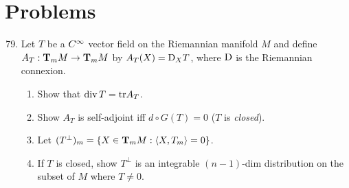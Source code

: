 \documentclass[../main]{subfiles}
\begin{document}
\section*{Problems}
\begin{enumerate}
\setcounter{enumi}{78}
    \item\label{pro:79} Let $T$ be a $\CInfty$ vector field on the Riemannian manifold $M$ and define $A_T: \tangentspace{M}{m}\functionMaps\tangentspace{M}{m}$ by $A_T(X) = \connection_X T$, where $\connection$ is the Riemannian connexion. 
    \begin{enumerate}[label=(\roman*)]
        \item Show that $\Div{T} = \tr{A_T}$.
        \item Show $A_T$ is self-adjoint iff $d\circ G(T) = 0$ ($T$ is \emph{closed}).
        \item Let $(T^\bot)_m = \{X \in \tangentspace{M}{m}: \ip{X}{T_m} = 0\}$.
        \item  If $T$ is closed, show $T^\bot$ is an integrable $(n-1)$-dim distribution on the subset of $M$ where $T\neq 0$.
    \end{enumerate}
      

\end{enumerate}
\end{document}
